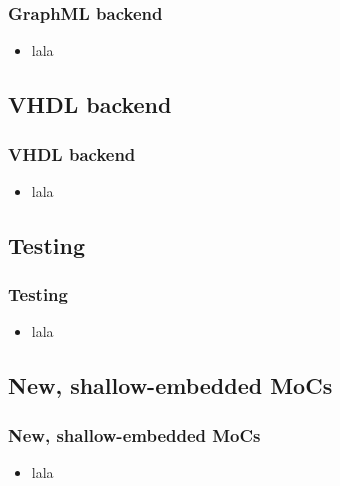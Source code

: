 \documentclass{beamer}
\begin{document}
\begin{frame}[fragile]
  \frametitle{GraphML backend}
  \begin{itemize}
  \item lala
  \end{itemize}
  
\end{frame}


\subsection{VHDL backend}

\begin{frame}[fragile]
  \frametitle{VHDL backend}
  \begin{itemize}
  \item lala
  \end{itemize}
  
\end{frame}

\subsection{Testing}

\begin{frame}
  \frametitle{Testing}
  \begin{itemize}
  \item lala
  \end{itemize}
  
\end{frame}

\subsection{New, shallow-embedded MoCs}

\begin{frame}
  \frametitle{New, shallow-embedded MoCs}
  \begin{itemize}
  \item lala
  \end{itemize}
  
\end{frame}
\end{document}
